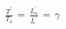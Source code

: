 \documentclass[preview]{standalone}
\begin{document}
\begin{align*}
\frac{T^{'}}{T_{o}}\,=\,\frac{L^{'}_{o}}{L^{'}}\,=\,\gamma
\end{align*}
\end{document}
